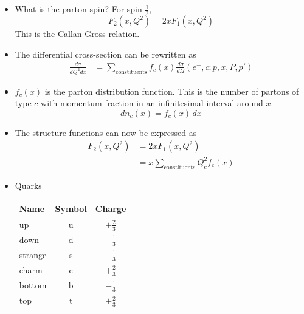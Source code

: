 \documentclass[a4paper, 11pt, normalem]{report}
\begin{document}
\chapter{}
\begin{itemize}
    \item What is the parton spin?
        For spin $\frac{1}{2}$, 
        \begin{equation}
            F_2(x,Q^2) = 2xF_1(x,Q^2)
        \end{equation}
        This is the Callan-Gross relation.
    \item The differential cross-section can be rewritten as
        \begin{align}
            \frac{d\sigma}{dQ^2dx} &= \sum_{\text{constituents}} f_c(x)\frac{d\sigma}{d\Omega}(e^-,c;p,x,P,p')
        \end{align}
    \item $f_c(x)$ is the parton distribution function.
        This is the number of partons of type $c$ with momentum fraction in an infinitesimal interval around $x$.
        \begin{equation}
            dn_c(x) = f_c(x)\,dx
        \end{equation}
    \item The structure functions can now be expressed as
        \begin{align}
            F_2(x,Q^2) &= 2xF_1(x,Q^2) \\
                       &= x\sum_{\text{constituents}} Q^2_cf_c(x)
        \end{align}
    \item Quarks 
        \begin{table}[H]
            \centering
            \begin{tabular}{l|c|c}
                Name    & Symbol & Charge \\
                \hline
                up      & u      & $+\frac23$ \\
                down    & d      & $-\frac13$ \\
                \hline
                strange & s      & $-\frac13$ \\
                charm   & c      & $+\frac23$ \\
                \hline
                bottom  & b      & $-\frac13$ \\
                top     & t      & $+\frac23$
            \end{tabular}
        \end{table}

\end{itemize}
\end{document}
